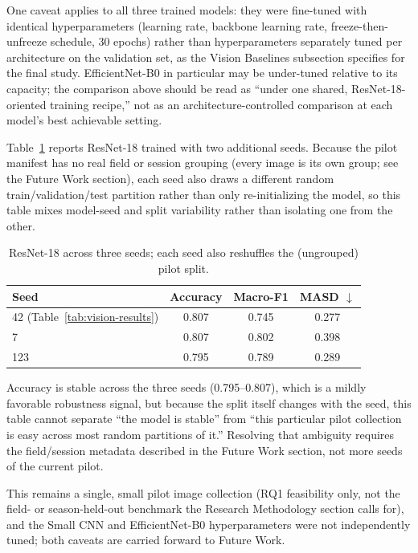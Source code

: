 \documentclass[conference]{IEEEtran}
\begin{document}
One caveat applies to all three trained models: they were fine-tuned with identical hyperparameters (learning rate, backbone learning rate, freeze-then-unfreeze schedule, 30 epochs) rather than hyperparameters separately tuned per architecture on the validation set, as the Vision Baselines subsection specifies for the final study. EfficientNet-B0 in particular may be under-tuned relative to its capacity; the comparison above should be read as ``under one shared, ResNet-18-oriented training recipe,'' not as an architecture-controlled comparison at each model's best achievable setting.

Table~\ref{tab:vision-multiseed} reports ResNet-18 trained with two additional seeds. Because the pilot manifest has no real field or session grouping (every image is its own group; see the Future Work section), each seed also draws a different random train/validation/test partition rather than only re-initializing the model, so this table mixes model-seed and split variability rather than isolating one from the other.

\begin{table}[t]
\caption{ResNet-18 across three seeds; each seed also reshuffles the (ungrouped) pilot split.}
\label{tab:vision-multiseed}
\centering
\footnotesize
\begin{tabular}{lccc}
\toprule
Seed & Accuracy & Macro-F1 & MASD $\downarrow$ \\
\midrule
42 (Table~\ref{tab:vision-results}) & 0.807 & 0.745 & 0.277 \\
7 & 0.807 & 0.802 & 0.398 \\
123 & 0.795 & 0.789 & 0.289 \\
\bottomrule
\end{tabular}
\end{table}

Accuracy is stable across the three seeds (0.795--0.807), which is a mildly favorable robustness signal, but because the split itself changes with the seed, this table cannot separate ``the model is stable'' from ``this particular pilot collection is easy across most random partitions of it.'' Resolving that ambiguity requires the field/session metadata described in the Future Work section, not more seeds of the current pilot.

This remains a single, small pilot image collection (RQ1 feasibility only, not the field- or season-held-out benchmark the Research Methodology section calls for), and the Small CNN and EfficientNet-B0 hyperparameters were not independently tuned; both caveats are carried forward to Future Work.
\end{document}
